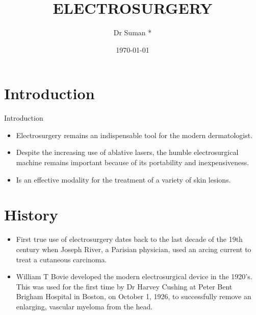 \documentclass[]{beamer}
\title[Electrosurgery]{ELECTROSURGERY}
\author[Dr Suman]{Dr Suman *}
\date{\today}
\institute[Department of Surgery]{* Teaching Hospital}
\begin{document}
\maketitle

\section{Introduction}

	
\begin{frame}{Introduction}
	\begin{itemize}
		\item Electrosurgery remains an indispensable tool for the modern dermatologist. 
		\item Despite the increasing use of
		ablative lasers, the humble electrosurgical
		machine remains important because of its
		portability and inexpensiveness.
		\item  Is an effective modality for the
		treatment of a variety of skin lesions.
	\end{itemize}

\end{frame}

\section{History}

\begin{frame}
\begin{itemize}
	\item First true use of electrosurgery dates back to the last decade of the 19th century when Joseph River, a Parisian physician, used an arcing current to treat a cutaneous carcinoma.
	\item William T Bovie developed the modern electrosurgical device in the 1920’s. This was used for the first time by Dr Harvey Cushing at Peter Bent Brigham Hospital in Boston, on October 1, 1926, to successfully remove an enlarging, vascular myeloma from the head.
\end{itemize}
\end{frame}
\end{document}

